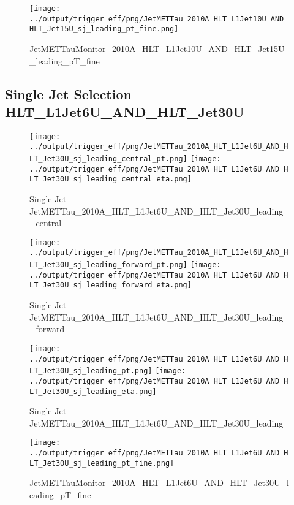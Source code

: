 \documentclass[11pt]{article}
\begin{document}
\begin{figure}[ht]
\centering
\texttt{[image: ../output/trigger\_eff/png/JetMETTau\_2010A\_HLT\_L1Jet10U\_AND\_HLT\_Jet15U\_sj\_leading\_pt\_fine.png]}
\caption{JetMETTauMonitor\_2010A\_HLT\_L1Jet10U\_AND\_HLT\_Jet15U\_leading\_pT\_fine}
\label{fig:jetmettau_sj_HLT_L1Jet10U_AND_HLT_Jet15U_leading_pT_fine}
\end{figure}
\clearpage


\newpage
\subsection{Single Jet Selection HLT\_L1Jet6U\_AND\_HLT\_Jet30U}
\begin{figure}[ht]
\centering
\texttt{[image: ../output/trigger\_eff/png/JetMETTau\_2010A\_HLT\_L1Jet6U\_AND\_HLT\_Jet30U\_sj\_leading\_central\_pt.png]}
\texttt{[image: ../output/trigger\_eff/png/JetMETTau\_2010A\_HLT\_L1Jet6U\_AND\_HLT\_Jet30U\_sj\_leading\_central\_eta.png]}
\caption{Single Jet JetMETTau\_2010A\_HLT\_L1Jet6U\_AND\_HLT\_Jet30U\_leading\_central}
\label{fig:jetmettau_sj_HLT_L1Jet6U_AND_HLT_Jet30U_leading_central}
\end{figure}

\begin{figure}[ht]
\centering
\texttt{[image: ../output/trigger\_eff/png/JetMETTau\_2010A\_HLT\_L1Jet6U\_AND\_HLT\_Jet30U\_sj\_leading\_forward\_pt.png]}
\texttt{[image: ../output/trigger\_eff/png/JetMETTau\_2010A\_HLT\_L1Jet6U\_AND\_HLT\_Jet30U\_sj\_leading\_forward\_eta.png]}
\caption{Single Jet JetMETTau\_2010A\_HLT\_L1Jet6U\_AND\_HLT\_Jet30U\_leading\_forward}
\label{fig:jetmettau_sj_HLT_L1Jet6U_AND_HLT_Jet30U_leading_forward}
\end{figure}

\begin{figure}[ht]
\centering
\texttt{[image: ../output/trigger\_eff/png/JetMETTau\_2010A\_HLT\_L1Jet6U\_AND\_HLT\_Jet30U\_sj\_leading\_pt.png]}
\texttt{[image: ../output/trigger\_eff/png/JetMETTau\_2010A\_HLT\_L1Jet6U\_AND\_HLT\_Jet30U\_sj\_leading\_eta.png]}
\caption{Single Jet JetMETTau\_2010A\_HLT\_L1Jet6U\_AND\_HLT\_Jet30U\_leading}
\label{fig:jetmettau_sj_HLT_L1Jet6U_AND_HLT_Jet30U_leading}
\end{figure}

\begin{figure}[ht]
\centering
\texttt{[image: ../output/trigger\_eff/png/JetMETTau\_2010A\_HLT\_L1Jet6U\_AND\_HLT\_Jet30U\_sj\_leading\_pt\_fine.png]}
\caption{JetMETTauMonitor\_2010A\_HLT\_L1Jet6U\_AND\_HLT\_Jet30U\_leading\_pT\_fine}
\label{fig:jetmettau_sj_HLT_L1Jet6U_AND_HLT_Jet30U_leading_pT_fine}
\end{figure}
\clearpage
\end{document}
